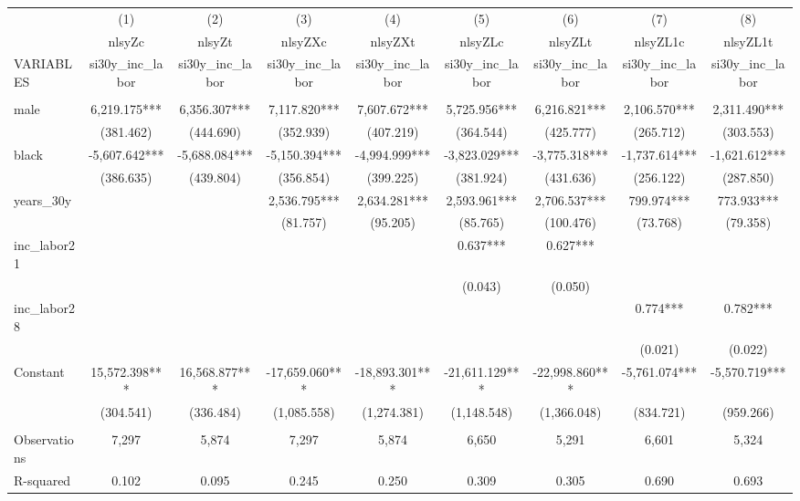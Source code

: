 \begin{tabular}{lcccccccc} \hline
 & (1) & (2) & (3) & (4) & (5) & (6) & (7) & (8) \\
 & nlsyZc & nlsyZt & nlsyZXc & nlsyZXt & nlsyZLc & nlsyZLt & nlsyZL1c & nlsyZL1t \\
VARIABLES & si30y\_inc\_labor & si30y\_inc\_labor & si30y\_inc\_labor & si30y\_inc\_labor & si30y\_inc\_labor & si30y\_inc\_labor & si30y\_inc\_labor & si30y\_inc\_labor \\ \hline
 &  &  &  &  &  &  &  &  \\
male & 6,219.175*** & 6,356.307*** & 7,117.820*** & 7,607.672*** & 5,725.956*** & 6,216.821*** & 2,106.570*** & 2,311.490*** \\
 & (381.462) & (444.690) & (352.939) & (407.219) & (364.544) & (425.777) & (265.712) & (303.553) \\
black & -5,607.642*** & -5,688.084*** & -5,150.394*** & -4,994.999*** & -3,823.029*** & -3,775.318*** & -1,737.614*** & -1,621.612*** \\
 & (386.635) & (439.804) & (356.854) & (399.225) & (381.924) & (431.636) & (256.122) & (287.850) \\
years\_30y &  &  & 2,536.795*** & 2,634.281*** & 2,593.961*** & 2,706.537*** & 799.974*** & 773.933*** \\
 &  &  & (81.757) & (95.205) & (85.765) & (100.476) & (73.768) & (79.358) \\
inc\_labor21 &  &  &  &  & 0.637*** & 0.627*** &  &  \\
 &  &  &  &  & (0.043) & (0.050) &  &  \\
inc\_labor28 &  &  &  &  &  &  & 0.774*** & 0.782*** \\
 &  &  &  &  &  &  & (0.021) & (0.022) \\
Constant & 15,572.398*** & 16,568.877*** & -17,659.060*** & -18,893.301*** & -21,611.129*** & -22,998.860*** & -5,761.074*** & -5,570.719*** \\
 & (304.541) & (336.484) & (1,085.558) & (1,274.381) & (1,148.548) & (1,366.048) & (834.721) & (959.266) \\
 &  &  &  &  &  &  &  &  \\
Observations & 7,297 & 5,874 & 7,297 & 5,874 & 6,650 & 5,291 & 6,601 & 5,324 \\
 R-squared & 0.102 & 0.095 & 0.245 & 0.250 & 0.309 & 0.305 & 0.690 & 0.693 \\ \hline
\end{tabular}
